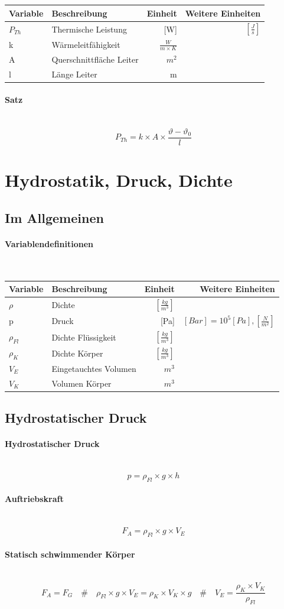 \documentclass[a4paper,10pt]{article}
\newcommand{\lbparagraph}[1]{\paragraph{#1}\mbox{}\\}
\newcommand{\eqsp}[1]{\quad\#\quad}
\begin{document}
\begin{tabular}{l|l|r|r}
    Variable & Beschreibung & Einheit & Weitere Einheiten \\
    \hline
    $P_{Th}$ & Thermische Leistung & [W] & $[\frac{J}{s}]$ \\
    k & Wärmeleitfähigkeit & $\frac{W}{m \times K}$ & \\
    A & Querschnittfläche Leiter & $m^2$ & \\
    l & Länge Leiter & m &
\end{tabular}

\lbparagraph{Satz}

\begin{equation}
    P_{Th} = k \times A \times \frac{\vartheta - {\vartheta}_0}{l}
\end{equation}

\section{Hydrostatik, Druck, Dichte}

\subsection{Im Allgemeinen}

\lbparagraph{Variablendefinitionen}

\begin{tabular}{l|l|r|r}
    Variable & Beschreibung & Einheit & Weitere Einheiten \\
    \hline
    $\rho$ & Dichte & $[\frac{kg}{m^3}]$ & \\
    p & Druck & [Pa] & $[Bar] =10^5 [Pa], [\frac{N}{m^2}]$ \\
    ${\rho}_{Fl}$ & Dichte Flüssigkeit & $[\frac{kg}{m^3}]$ & \\
    ${\rho}_K$ & Dichte Körper & $[\frac{kg}{m^3}]$ & \\
    $V_E$ & Eingetauchtes Volumen & $m^3$ & \\
    $V_K$ & Volumen Körper & $m^3$ &
\end{tabular}

\subsection{Hydrostatischer Druck}

\lbparagraph{Hydrostatischer Druck}

\begin{equation}
    p = {\rho}_{Fl} \times g \times h
\end{equation}

\lbparagraph{Auftriebskraft}

\begin{equation}
    F_A = {\rho}_{Fl} \times g \times V_E
\end{equation}

\lbparagraph{Statisch schwimmender Körper}

\begin{equation}
    F_A = F_G
    \eqsp{}
    {\rho}_{Fl} \times g \times V_E = {\rho}_K \times V_K \times g
    \eqsp{}
    V_E = \frac{{\rho}_K \times V_K}{{\rho}_{Fl}}
\end{equation}
\end{document}
